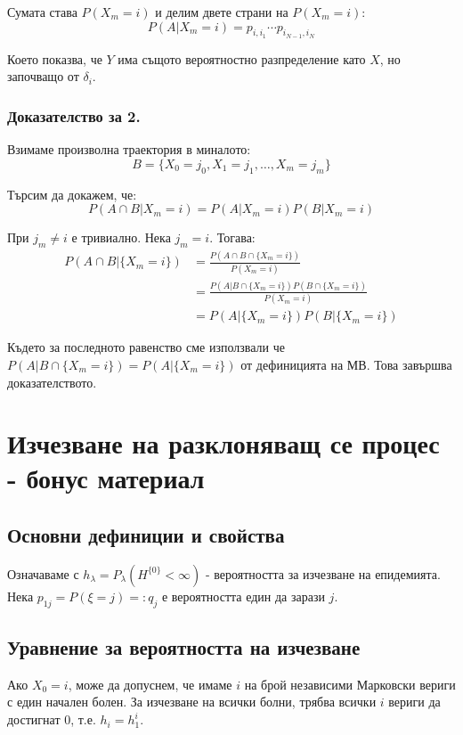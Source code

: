 \documentclass{article}
\begin{document}
Сумата става $P(X_m = i)$ и делим двете страни на $P(X_m = i)$:
$$P(A | X_m = i) = p_{i,i_1}\cdots p_{i_{N-1},i_N}$$

Което показва, че $Y$ има същото вероятностно разпределение като $X$, но започващо от $\delta_i$.

\subsubsection*{Доказателство за 2.}
Взимаме произволна траектория в миналото:
$$B = \{X_0 = j_0, X_1 = j_1, \dots, X_m = j_m\}$$

Търсим да докажем, че:
$$P(A \cap B | X_m = i) = P(A | X_m = i)P(B | X_m = i)$$

При $j_m\neq i$ е тривиално. Нека $j_m=i$. Тогава:
\begin{align*}
P(A \cap B | \{X_m = i\}) &= \frac{P(A \cap B \cap \{X_m = i\})}{P(X_m = i)} \\
&= \frac{P(A | B \cap \{X_m = i\})P(B \cap \{X_m = i\})}{P(X_m = i)} \\
&= P(A | \{X_m = i\})P(B | \{X_m = i\})
\end{align*}

Където за последното равенство сме използвали че \\ $P(A | B\cap \{X_m = i\}) = P(A|\{X_m=i\})$ от дефиницията на МВ.
Това завършва доказателството.

\section{Изчезване на разклоняващ се процес - бонус материал}
\subsection{Основни дефиниции и свойства}
Означаваме с $h_\lambda = P_\lambda(H^{\{0\}} < \infty)$ - вероятността за изчезване на епидемията. \\ 
Нека $p_{1j} = P(\xi = j) =: q_j$ е вероятността един да зарази $j$.

\subsection{Уравнение за вероятността на изчезване}

Ако $X_0 = i$, може да допуснем, че имаме $i$ на брой независими Марковски вериги с един начален болен. 
За изчезване на всички болни, трябва всички $i$ вериги да достигнат 0, т.е. $h_i = h_1^i$. \\
\end{document}
